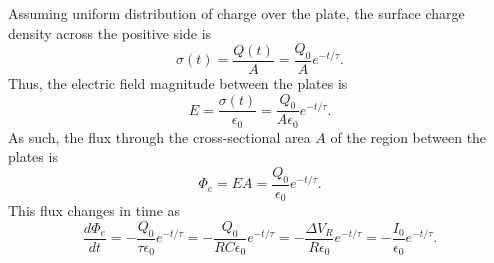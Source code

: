 \documentclass[]{article}
\begin{document}
Assuming uniform distribution of charge over the plate, the surface charge density across the positive side is
\[
	\sigma(t) = \frac{Q(t)}{A} = \frac{Q_{0}}{A}e^{-t/\tau}.
\]
Thus, the electric field magnitude between the plates is
\[
	E = \frac{\sigma(t)}{\epsilon_{0}} = \frac{Q_{0}}{A\epsilon_{0}}e^{-t/\tau}.
\]
As such, the flux through the cross-sectional area $ A $ of the region between the plates is
\[
	\Phi_{e} = EA = \frac{Q_{0}}{\epsilon_{0}}e^{-t/\tau}.
\]
	This flux changes in time as
\[
	\frac{d\Phi_{e}}{dt} = -\frac{Q_{0}}{\tau\epsilon_{0}}e^{-t/\tau} = -\frac{Q_{0}}{RC\epsilon_{0}}e^{-t/\tau} = -\frac{\Delta V_{R}}{R\epsilon_{0}}e^{-t/\tau} = -\frac{I_{0}}{\epsilon_{0}}e^{-t/\tau}.
\]
\begin{comment}
Displacement current is defined to be $ I_{disp} = \epsilon_{0}\frac{d\Phi_{e}}{dt} $, so
\[
	I_{disp}(t) = -I_{0}e^{-t/\tau} = -I(t).
\]
We see that the magnitude of displacement current is the same as the magnitude of true current in the system over time. The negative sign indicates that the displacement current is opposite the electric field in the capacitor (caused by the field decreasing). This would make the current flow toward the positive plate, and actual current is leaving this plate down the wire as the capacitor discharges, so the direction of the displacement current is actually consistent with the direction of true current in the system.
\end{comment}
\end{document}
